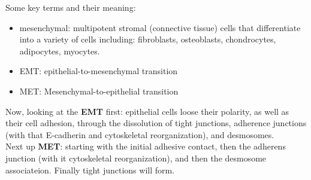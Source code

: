 \documentclass[../main.tex]{subfiles}
\begin{document}
Some key terms and their meaning:
\begin{itemize}
	\item \gls{mesenchymal}: multipotent stromal (connective tissue) cells that differentiate into a variety of cells including: fibroblasts, osteoblasts, chondrocytes, adipocytes, myocytes.
	\item \gls{EMT}: epithelial-to-mesenchymal transition
	\item \gls{MET}: Mesenchymal-to-epithelial transition
\end{itemize}

Now, looking at the \textbf{EMT} first: epithelial cells loose their polarity, as well as their cell adhesion, through the dissolution of tight junctions, adherence junctions (with that E-cadherin and cytoskeletal reorganization), and desmosomes. \\

Next up \textbf{MET}:  starting with the initial adhesive contact, then the adherens junction (with it cytoskeletal reorganization), and then the desmosome associateion. Finally tight junctions will form.

\begin{figure}[H]
	\centering
	\caption{}
	\label{fig:metemt}
\end{figure}
\end{document}
